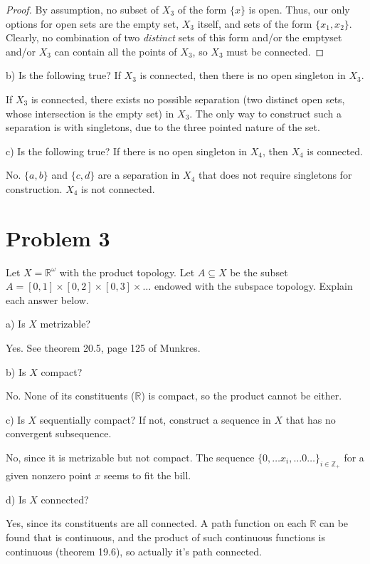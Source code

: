 \documentclass[11pt]{article}
\begin{document}
\begin{proof}
By assumption, no subset of \(X_3\) of the form \(\{x\}\) is open. Thus, our only
options for open sets are the empty set, \(X_3\) itself, and sets of the form
\(\{x_1, x_2\}\). Clearly, no combination of two \textit{distinct} sets of this
form and/or the emptyset and/or \(X_3\) can contain all the points of \(X_3\), so
\(X_3\) must be connected. 
\end{proof}

b) Is the following true? If \(X_3\) is connected, then there is no open singleton
in \(X_3\).

If \(X_3\) is connected, there exists no possible separation (two distinct open
sets, whose intersection is the empty set) in \(X_3\). The only way to construct
such a separation is with singletons, due to the three pointed nature of the
set.  

c) Is the following true? If there is no open singleton in \(X_4\), then \(X_4\) is
connected. 

No. \(\{a,b\}\) and \(\{c, d\}\) are a separation in \(X_4\) that does not require
singletons for construction. \(X_4\) is not connected. 

\section{Problem 3}
\label{sec:org4839279}
Let \(X = \mathbb{R}^{\omega}\) with the product topology. Let \(A\subseteq X\) be
the subset \(A = [0,1]\times [0,2]\times [0,3]\times\ldots\) endowed with the
subspace topology. Explain each answer below. 

a) Is \(X\) metrizable? 

Yes. See theorem 20.5, page 125 of Munkres. 

b) Is \(X\) compact? 

No. None of its constituents (\(\mathbb{R}\)) is compact, so
the product cannot be either. 

c) Is \(X\) sequentially compact? If not, construct a sequence in \(X\) that has no
convergent subsequence. 

No, since it is metrizable but not compact. The sequence \(\{0, \ldots x_i,
\ldots 0 \ldots\}_{i\in\mathbb{Z}_+}\) for a given nonzero point \(x\) seems to fit
the bill.

d) Is \(X\) connected? 

Yes, since its constituents are all connected. A path function on each
\(\mathbb{R}\) can be found that is continuous, and the product of such continuous
functions is continuous (theorem 19.6), so actually it's path connected.
\end{document}
